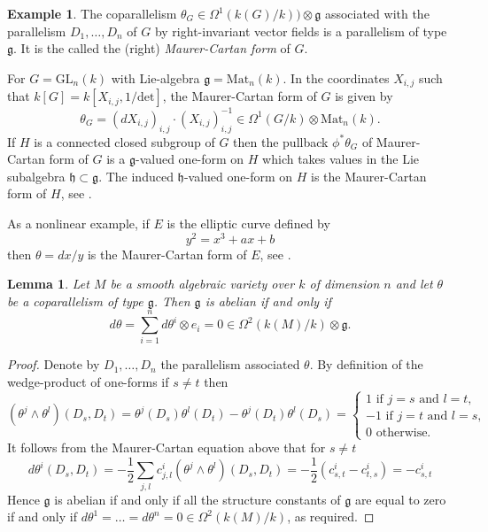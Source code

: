 \documentclass[12pt]{amsart}
\theoremstyle{definition}
\newtheorem{exam}[defn]{Example}
\theoremstyle{plain}
\newtheorem{lem}[defn]{Lemma}
\theoremstyle{exampstyle}\newtheorem{thmx}{Theorem}
\theoremstyle{exampstyle}\newtheorem{thmxbis}{Theorem}
\begin{document}
\begin{exam} 
The coparallelism $\theta_G \in \Omega^1(k(G)/k)) \otimes \mathfrak{g}$ associated with the parallelism $D_1,\ldots,D_n$ of $G$ by right-invariant vector fields is a parallelism of type $\mathfrak{g}$. It is the called the (right) {\em Maurer-Cartan form} of $G$.


For $G = \mathrm{GL}_n(k)$ with Lie-algebra $\mathfrak{g} = \mathrm{Mat}_n(k)$. In the coordinates $X_{i,j}$ such that $k[G] = k[X_{i,j}, 1/\mathrm{det}]$, the Maurer-Cartan form of $G$ is given by $$\theta_G = (dX_{i,j})_{i,j} \cdot (X_{i,j})_{i,j}^{-1} \in \Omega^1(G/k) \otimes \mathrm{Mat}_n(k).$$
If $H$ is a connected closed subgroup of $G$ then the pullback $\phi^\ast \theta_G$ of Maurer-Cartan form of $G$ is a $\mathfrak{g}$-valued one-form on $H$ which takes values in the Lie subalgebra $\mathfrak{h} \subset \mathfrak{g}$. The induced $\mathfrak{h}$-valued one-form on $H$ is the Maurer-Cartan form of $H$, see \cite[Chapter 3, Corollary 1.9]{Sharpe}.

As a nonlinear example, if $E$ is the elliptic curve defined by 
$$y^2 = x^3 + ax + b $$
then $\theta = dx/y$ is the Maurer-Cartan form of $E$, see \cite[Chapter 3, Section 5]{Silverman}.
\end{exam}



\begin{lem} \label{lemma-commutativity}
Let $M$ be a smooth algebraic variety over $k$ of dimension $n$ and let $\theta$ be a coparallelism of type $\mathfrak{g}$. Then $\mathfrak{g}$ is abelian if and only if
$$ d\theta = \sum_{i = 1}^n d \theta^i \otimes e_i = 0 \in \Omega^2(k(M)/k) \otimes \mathfrak{g}.$$
\end{lem} 

\begin{proof} 
Denote by $D_1,\ldots, D_n$ the parallelism associated $\theta$. By definition of the wedge-product of one-forms if $s \neq t$ then 
$$ (\theta^j \wedge \theta ^l) (D_s, D_t) = \theta^j(D_s) \theta^l (D_t) - \theta^j(D_t) \theta^l (D_s) = \begin{cases} 1 \text{ if } j = s \text{ and } l = t, \\ -1 \text{ if } j = t \text{ and } l = s, \\ 0 \text{ otherwise.}
\end{cases}$$
It follows from the Maurer-Cartan equation above that for $s \neq t$
$$ d\theta^i(D_s,D_t) = -\frac 1 2 \sum_{j,l} c^i_{j,l} (\theta^j \wedge \theta^l) (D_s,D_t) = -\frac 1 2 (c^i_{s,t} - c^i_{t,s}) = - c^i_{s,t}  $$
Hence $\mathfrak{g}$ is abelian if and only if all the structure constants of $\mathfrak{g}$ are equal to zero if and only if $d\theta^1 = \ldots = d\theta^n = 0 \in \Omega^2(k(M)/k)$, as required.
\end{proof} 
\end{document}
